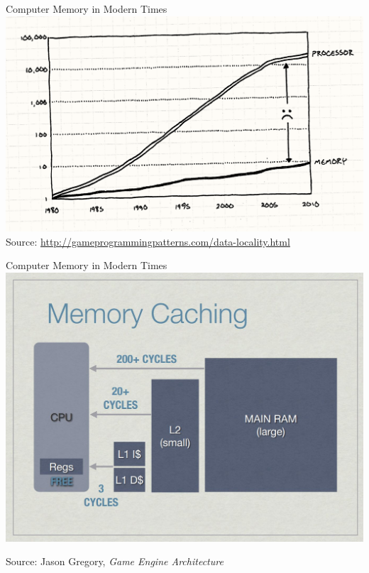 \documentclass[10pt,xcolor=dvipsnames]{beamer}
\begin{document}
\begin{frame}{Computer Memory in Modern Times}
  \centering\includegraphics[scale=0.3]{data-locality-chart.png}
  \tiny{Source: \url{http://gameprogrammingpatterns.com/data-locality.html}}
\end{frame}

\begin{frame}{Computer Memory in Modern Times}
  \centering\includegraphics[scale=0.2]{memory-hierarchy.jpg}

  \tiny{Source: Jason Gregory, \textsl{Game Engine Architecture}}
\end{frame}
\end{document}

